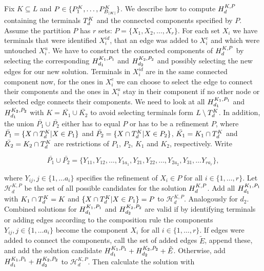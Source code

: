 Fix $K \subseteq L$ and $P\in \{P_{1}^{K},\ldots,P_{B_{|K|}}^{K}\}$. We describe how to compute $H_{d}^{K,P}$ containing the terminals $T_{d}^{K}$ and the connected components specified by $P$. Assume the partition $P$ has $r$ sets: $P = \{X_1,X_2,\ldots,X_r\}$. For each set $X_i$ we have terminals that were identified $X_i^{id}$, that an edge was added to $X_i^{e}$ and which were untouched $X_i^{u}$. We have to construct the connected components of $H_{d}^{K,P}$ by selecting the corresponding $H_{d_1}^{K_1,P_1}$ and $H_{d_2}^{K_2,P_2}$ and possibly selecting the new edges for our new solution. Terminals in $X_i^{id}$ are in the same connected component now, for the ones in $X_i^{e}$ we can choose to select the edge to connect their components and the ones in $X_i^{u}$ stay in their component if no other node or selected edge connects their components. We need to look at all $H_{d_1}^{K_1,P_1}$ and $H_{d_1}^{K_2,P_2}$ with $K = \bar{K_1} \cup \bar{K_2}$ to avoid selecting terminals form $L\setminus T_{d}^{K}$. In addition, the union $\bar{P_1} \cup \bar{P_2}$ either has to equal $P$ or has to be a refinement $P$, where $\bar{P_1} = \{ X \cap T_{d}^{K} | X \in P_1\}$ and $\bar{P_2} = \{ X \cap T_{d}^{K} | X \in P_2\}$, $\bar{K_1} = K_1 \cap T_{d}^{K}$ and $\bar{K_2} = K_2 \cap T_{d}^{K}$ are restrictions of $P_1$, $P_2$, $K_1$ and $K_2$, respectively. Write

$$\bar{P_1} \cup \bar{P_2} = \{Y_{11}, Y_{12}, \ldots, Y_{1a_{1}}, Y_{21}, Y_{22}, \ldots, Y_{2a_{2}}, Y_{31}, \ldots Y_{ra_{r}} \},$$

where $Y_{ij}, j\in \{1,\ldots a_i\}$ specifies the refinement of $X_i \in P$ for all $i \in \{1, \ldots, r\}$. Let $\mathcal{H}_d^{K,P}$ be the set of all possible candidates for the solution $H_{d}^{K,P}$. Add all $H_{d_1}^{K_1,P_1}$ with $K_1 \cap T_{d}^{K} = K$ and $\{ X \cap T_{d}^{K} | X \in P_1\} = P$ to $\mathcal{H}_d^{K,P}$. Analogously for $d_2$.  Combined solutions for $H_{d_1}^{K_1,P_1}$ and $H_{d_2}^{K_2,P_2}$ are valid if by identifying terminals or adding edges according to the composition rule the components $Y_{ij}, j\in \{1,\ldots a_i\}$ become the component $X_i$ for all $i \in \{1, \ldots, r\}$. If edges were added to connect the components, call the set of added edges $\tilde{E}$, append these, and add the solution candidate $H_{d_1}^{K_1,P_1} + H_{d_2}^{K_2,P_2} + \tilde{E}$. Otherwise, add $H_{d_1}^{K_1,P_1} + H_{d_2}^{K_2,P_2}$ to $\mathcal{H}_d^{K,P}$. Then calculate the solution with

